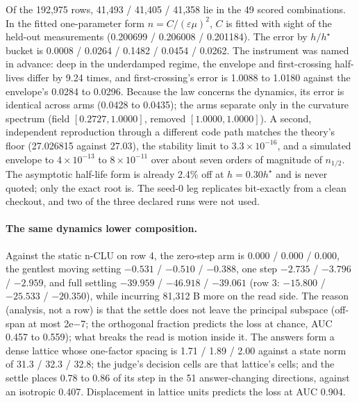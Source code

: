 \documentclass{article} %
\newcommand{\sci}[2]{\ensuremath{#1\times10^{#2}}}
\begin{document}
\noindent Of the 192,975 rows, 41,493 / 41,405 / 41,358 lie in the 49 scored combinations. In the fitted
one-parameter form $n=C/(\varepsilon\mu)^2$, $C$ is fitted with sight of the held-out measurements
(0.200699 / 0.206008 / 0.201184). %
The error by $h/h^\star$ bucket is 0.0008 / 0.0264 / 0.1482 / 0.0454 / 0.0262. The instrument was
named in advance: deep in the underdamped regime, the envelope and first-crossing half-lives differ
by 9.24 times, and first-crossing's error is 1.0088 to 1.0180 against the envelope's 0.0284 to 0.0296.
Because the law concerns the dynamics, its error is identical across arms (0.0428 to 0.0435); the
arms separate only in the curvature spectrum (field $[0.2727, 1.0000]$, removed $[1.0000, 1.0000]$).
A second, independent reproduction through a different code path matches the theory's floor
(27.026815 against 27.03), the stability limit to \sci{3.3}{-16}, and a simulated envelope to
\sci{4}{-13} to \sci{8}{-11} over about seven orders of magnitude of $n_{1/2}$. The asymptotic
half-life form is already 2.4\% off at $h=0.30h^\star$ and is never quoted; only the exact root is.
The seed-0 leg replicates bit-exactly from a clean checkout, and two of the three declared runs
were not used. %

\paragraph{The same dynamics lower composition.} Against the static n-CLU on row 4, the zero-step
arm is $0.000$ / $0.000$ / $0.000$, the gentlest moving setting $-0.531$ / $-0.510$ / $-0.388$, one
step $-2.735$ / $-3.796$ / $-2.959$, and full settling $-39.959$ / $-46.918$ / $-39.061$ (row 3:
$-15.800$ / $-25.533$ / $-20.350$), while incurring 81,312 B more on the read side.
The reason (analysis, not a row) is that the settle does not leave the principal subspace (off-span
at most 2e$-$7; the orthogonal fraction predicts the loss at chance, AUC 0.457 to 0.559); what breaks
the read is motion inside it. The answers form a dense lattice whose one-factor spacing is 1.71 / 1.89 /
2.00 against a state norm of 31.3 / 32.3 / 32.8; the judge's decision cells are that lattice's
cells; and the settle places 0.78 to 0.86 of its step in the 51 answer-changing directions, against
an isotropic 0.407. Displacement in lattice units predicts the loss at AUC 0.904.
\end{document}
